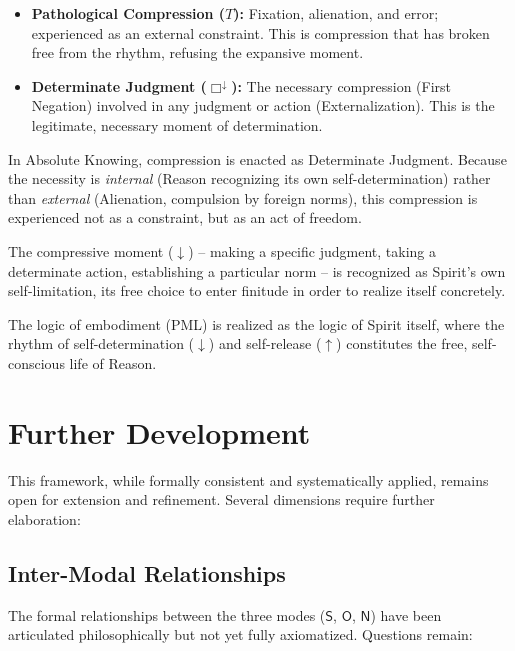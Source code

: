 \documentclass[12pt]{book}
\begin{document}
\begin{itemize}
\item \textbf{Pathological Compression ($T$):} Fixation, alienation, and error; experienced as an external constraint. This is compression that has broken free from the rhythm, refusing the expansive moment.

\item \textbf{Determinate Judgment ($\Box^{\downarrow}$):} The necessary compression (First Negation) involved in any judgment or action (Externalization). This is the legitimate, necessary moment of determination.
\end{itemize}

In Absolute Knowing, compression is enacted as Determinate Judgment. Because the necessity is \textit{internal} (Reason recognizing its own self-determination) rather than \textit{external} (Alienation, compulsion by foreign norms), this compression is experienced not as a constraint, but as an act of freedom.

The compressive moment ($\downarrow$) -- making a specific judgment, taking a determinate action, establishing a particular norm -- is recognized as Spirit's own self-limitation, its free choice to enter finitude in order to realize itself concretely.

The logic of embodiment (PML) is realized as the logic of Spirit itself, where the rhythm of self-determination ($\downarrow$) and self-release ($\uparrow$) constitutes the free, self-conscious life of Reason.


\section{Further Development}

This framework, while formally consistent and systematically applied, remains open for extension and refinement. Several dimensions require further elaboration:

\subsection{Inter-Modal Relationships}

The formal relationships between the three modes ($\mathsf{S}$, $\mathsf{O}$, $\mathsf{N}$) have been articulated philosophically but not yet fully axiomatized. Questions remain:
\end{document}
